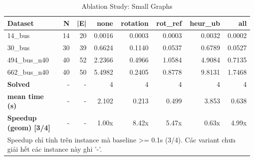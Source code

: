 \begin{table}[htbp]
\centering
\caption{Ablation Study: Small Graphs}
\label{tab:table_ablation_small}
\begin{tabular}{lrrrrrrr}
\toprule
Dataset & N & |E| & none & rotation & rot\_ref & heur\_ub & all \\
\midrule
14\_bus & 14 & 20 & 0.0016 & 0.0003 & 0.0003 & 0.0032 & 0.0002 \\
30\_bus & 30 & 39 & 0.6624 & 0.1140 & 0.0537 & 0.6789 & 0.0527 \\
494\_bus\_n40 & 40 & 52 & 2.2366 & 0.4966 & 1.0584 & 4.9084 & 0.7135 \\
662\_bus\_n40 & 40 & 50 & 5.4982 & 0.2405 & 0.8778 & 9.8131 & 1.7468 \\
\midrule
\textbf{Solved} & - & - & 4 & 4 & 4 & 4 & 4 \\
\textbf{mean time (s)} & - & - & 2.102 & 0.213 & 0.499 & 3.853 & 0.638 \\
\textbf{Speedup (geom) [3/4]} & - & - & 1.00x & 8.42x & 5.47x & 0.63x & 4.99x \\
\bottomrule
\multicolumn{8}{l}{\footnotesize Speedup chỉ tính trên instance mà baseline >= 0.1s (3/4). Các variant chưa giải hết các instance này ghi '-'.} \\
\end{tabular}
\end{table}
